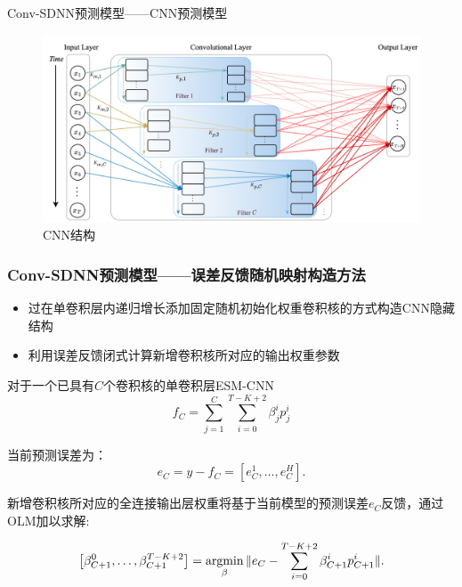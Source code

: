 \begin{frame}{Conv-SDNN预测模型——CNN预测模型}


    \begin{figure}[!t]
        \centering
        \begin{minipage}{0.8\textwidth}
            \includegraphics[width = \textwidth]{float/ch.cnn/esm-cnn.png}
            \caption*{CNN结构}
        \end{minipage}    
    \end{figure}



\end{frame}

\begin{frame}
    \frametitle{Conv-SDNN预测模型——误差反馈随机映射构造方法}
    \begin{itemize}
        \item 过在单卷积层内递归增长添加固定随机初始化权重卷积核的方式构造CNN隐藏结构
        \item 利用误差反馈闭式计算新增卷积核所对应的输出权重参数
    \end{itemize}

    对于一个已具有$C$个卷积核的单卷积层ESM-CNN
    \begin{equation*}
        f_C= \sum^C_{j=1}\sum^{T-K+2}_{i=0} \beta_j^i p_j^i
    \end{equation*}

    当前预测误差为：
    \begin{equation*}
        e_C = y - f_C = [e_C^1,\ldots, e_C^H].
    \end{equation*}

    新增卷积核所对应的全连接输出层权重将基于当前模型的预测误差$e_C$反馈，通过OLM加以求解:

    \vspace{-1.5em}
    \begin{equation*}
        \left[\beta_{{C+1}}^0, \ldots, \beta_{{C+1}}^{T-K+2} \right]=\operatorname*{argmin} _{\beta}\|e_C -\sum_{i=0}^{T-K+2} \beta_{C+1}^i p_{C+1}^i \|.
    \end{equation*}
\end{frame}

